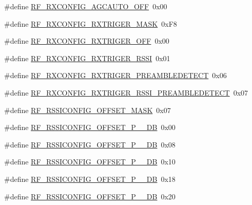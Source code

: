 \begin{DoxyCompactItemize}
\item 
\#define \mbox{\hyperlink{sx1276_regs-_fsk_8h_acae238b6c7912d2900ef6f6a66eff67c}{R\+F\+\_\+\+R\+X\+C\+O\+N\+F\+I\+G\+\_\+\+A\+G\+C\+A\+U\+T\+O\+\_\+\+O\+FF}}~0x00
\item 
\#define \mbox{\hyperlink{sx1276_regs-_fsk_8h_a6484d9c4b47e7a5860ad4d2ffa85f7fc}{R\+F\+\_\+\+R\+X\+C\+O\+N\+F\+I\+G\+\_\+\+R\+X\+T\+R\+I\+G\+E\+R\+\_\+\+M\+A\+SK}}~0x\+F8
\item 
\#define \mbox{\hyperlink{sx1276_regs-_fsk_8h_ab7bc69d7042e25e9e1c38cc4a82d5510}{R\+F\+\_\+\+R\+X\+C\+O\+N\+F\+I\+G\+\_\+\+R\+X\+T\+R\+I\+G\+E\+R\+\_\+\+O\+FF}}~0x00
\item 
\#define \mbox{\hyperlink{sx1276_regs-_fsk_8h_a9c49c770ce3e8a7629c47d1c1485a9b3}{R\+F\+\_\+\+R\+X\+C\+O\+N\+F\+I\+G\+\_\+\+R\+X\+T\+R\+I\+G\+E\+R\+\_\+\+R\+S\+SI}}~0x01
\item 
\#define \mbox{\hyperlink{sx1276_regs-_fsk_8h_a46818be362acfd8e971b2ba909a5bd48}{R\+F\+\_\+\+R\+X\+C\+O\+N\+F\+I\+G\+\_\+\+R\+X\+T\+R\+I\+G\+E\+R\+\_\+\+P\+R\+E\+A\+M\+B\+L\+E\+D\+E\+T\+E\+CT}}~0x06
\item 
\#define \mbox{\hyperlink{sx1276_regs-_fsk_8h_ac0fb8096e173b7862b65d689a21a8d57}{R\+F\+\_\+\+R\+X\+C\+O\+N\+F\+I\+G\+\_\+\+R\+X\+T\+R\+I\+G\+E\+R\+\_\+\+R\+S\+S\+I\+\_\+\+P\+R\+E\+A\+M\+B\+L\+E\+D\+E\+T\+E\+CT}}~0x07
\item 
\#define \mbox{\hyperlink{sx1276_regs-_fsk_8h_a699dac31bce270b1076bcf3026d007db}{R\+F\+\_\+\+R\+S\+S\+I\+C\+O\+N\+F\+I\+G\+\_\+\+O\+F\+F\+S\+E\+T\+\_\+\+M\+A\+SK}}~0x07
\item 
\#define \mbox{\hyperlink{sx1276_regs-_fsk_8h_aa354cb5789ab8e09067569f67a359440}{R\+F\+\_\+\+R\+S\+S\+I\+C\+O\+N\+F\+I\+G\+\_\+\+O\+F\+F\+S\+E\+T\+\_\+\+P\+\_\+\_\+\+DB}}~0x00
\item 
\#define \mbox{\hyperlink{sx1276_regs-_fsk_8h_a0a3e7708d76f93e58d8edd106f1a2276}{R\+F\+\_\+\+R\+S\+S\+I\+C\+O\+N\+F\+I\+G\+\_\+\+O\+F\+F\+S\+E\+T\+\_\+\+P\+\_\+\_\+\+DB}}~0x08
\item 
\#define \mbox{\hyperlink{sx1276_regs-_fsk_8h_a353ff92327056e55a727979d6a82e27a}{R\+F\+\_\+\+R\+S\+S\+I\+C\+O\+N\+F\+I\+G\+\_\+\+O\+F\+F\+S\+E\+T\+\_\+\+P\+\_\+\_\+\+DB}}~0x10
\item 
\#define \mbox{\hyperlink{sx1276_regs-_fsk_8h_a94023f7a527573099d0c794d75c9d808}{R\+F\+\_\+\+R\+S\+S\+I\+C\+O\+N\+F\+I\+G\+\_\+\+O\+F\+F\+S\+E\+T\+\_\+\+P\+\_\+\_\+\+DB}}~0x18
\item 
\#define \mbox{\hyperlink{sx1276_regs-_fsk_8h_aea0ec0438ba56a524841136e5237f4ad}{R\+F\+\_\+\+R\+S\+S\+I\+C\+O\+N\+F\+I\+G\+\_\+\+O\+F\+F\+S\+E\+T\+\_\+\+P\+\_\+\_\+\+DB}}~0x20

\end{DoxyCompactItemize}
